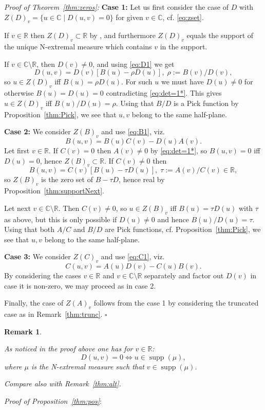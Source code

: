 \documentclass [12pt]{article}
\newtheorem{rem}[thm]{Remark}
\DeclareMathOperator{\supp}{supp}
\newcommand{\C}{\mathbb{C}}
\newcommand{\R}{\mathbb{R}}
\begin{document}
{\it Proof of Theorem~\ref{thm:zeros}:} {\bf Case 1:} Let us first consider the case of $D$ with
 $Z(D)_v=\{u\in\C\mid D(u,v)=0\}$ for given $v\in\C$, cf. \eqref{eq:zset}.
 
 If $v\in\R$ then $Z(D)_v\subset\R$ by \cite[Theorem 3]{B:C}, and furthermore $Z(D)_v$ equals the support of the unique N-extremal measure which contains $v$ in the support.
 
 If $v\in\C\setminus\R$, then $D(v)\neq 0$, and using \eqref{eq:D1} we get
 $$
 D(u,v)=D(v)[B(u)-\rho D(u)],\;\rho:=B(v)/D(v),
 $$
 so $u\in Z(D)_v$ iff $B(u)=\rho D(u)$. For such $u$ we must have $D(u)\neq 0$ for otherwise $B(u)=D(u)=0$ contradicting \eqref{eq:det=1*}. This gives $u\in Z(D)_v$ iff
 $B(u)/D(u)=\rho$. Using that $B/D$ is a Pick function by  Proposition~\ref{thm:Pick},  we see that $u,v$ belong to the same half-plane.

{\bf Case 2:} We consider $Z(B)_v$ and  use \eqref{eq:B1}, viz.
$$
B(u,v)=B(u)C(v)-D(u)A(v). 
$$
Let first $v\in\R$. If $C(v)=0$ then $A(v)\neq 0$ by \eqref{eq:det=1*}, so $B(u,v)=0$ iff $D(u)=0$, hence $Z(B)_v\subset\R$. If $C(v)\neq 0$ then
$$
B(u,v)=C(v)[B(u)-\tau D(u)],\;\tau:=A(v)/C(v)\in\R,
$$
so $Z(B)_v$ is the zero set of $B-\tau D$, hence real  by Proposition~\ref{thm:supportNext}. 

Let next $v\in\C\setminus \R$. Then $C(v)\neq 0$, so $u\in Z(B)_v$ iff $B(u)=\tau D(u)$ with $\tau$ as above, but this is only possible if $D(u)\neq 0$ and hence $B(u)/D(u)=\tau$.
Using that both  $A/C$ and $B/D$ are Pick functions, cf. Proposition~\ref{thm:Pick}, we see that $u,v$ belong to the same half-plane.

{\bf Case 3:} We consider $Z(C)_v$ and  use \eqref{eq:C1}, viz.
$$
C(u,v)=A(u)D(v)-C(u)B(v).
$$
By considering the cases $v\in\R$ and $v\in\C\setminus \R$ separately  and factor out $D(v)$ in case it is non-zero, we may
proceed as in case 2.

Finally, the case of $Z(A)_v$  follows from the case 1 by considering the truncated case as in Remark~\ref{thm:trunc}. $\square$

\begin{rem}\label{thm:Dspec} {\rm As noticed in the proof above one has for $v\in\R$:
$$
D(u,v)=0 \iff u\in\supp(\mu),
$$
where $\mu$ is the N-extremal measure such that $v\in\supp(\mu)$.

Compare also with Remark~\ref{thm:alt}.
}
\end{rem}

{\it Proof of Proposition~\ref{thm:pos}}:
\end{document}
